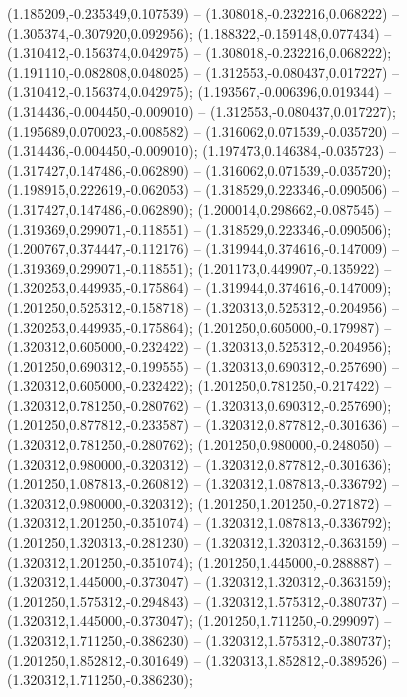  (1.185209,-0.235349,0.107539) -- (1.308018,-0.232216,0.068222) -- (1.305374,-0.307920,0.092956);
 (1.188322,-0.159148,0.077434) -- (1.310412,-0.156374,0.042975) -- (1.308018,-0.232216,0.068222);
 (1.191110,-0.082808,0.048025) -- (1.312553,-0.080437,0.017227) -- (1.310412,-0.156374,0.042975);
 (1.193567,-0.006396,0.019344) -- (1.314436,-0.004450,-0.009010) -- (1.312553,-0.080437,0.017227);
 (1.195689,0.070023,-0.008582) -- (1.316062,0.071539,-0.035720) -- (1.314436,-0.004450,-0.009010);
 (1.197473,0.146384,-0.035723) -- (1.317427,0.147486,-0.062890) -- (1.316062,0.071539,-0.035720);
 (1.198915,0.222619,-0.062053) -- (1.318529,0.223346,-0.090506) -- (1.317427,0.147486,-0.062890);
 (1.200014,0.298662,-0.087545) -- (1.319369,0.299071,-0.118551) -- (1.318529,0.223346,-0.090506);
 (1.200767,0.374447,-0.112176) -- (1.319944,0.374616,-0.147009) -- (1.319369,0.299071,-0.118551);
 (1.201173,0.449907,-0.135922) -- (1.320253,0.449935,-0.175864) -- (1.319944,0.374616,-0.147009);
 (1.201250,0.525312,-0.158718) -- (1.320313,0.525312,-0.204956) -- (1.320253,0.449935,-0.175864);
 (1.201250,0.605000,-0.179987) -- (1.320312,0.605000,-0.232422) -- (1.320313,0.525312,-0.204956);
 (1.201250,0.690312,-0.199555) -- (1.320313,0.690312,-0.257690) -- (1.320312,0.605000,-0.232422);
 (1.201250,0.781250,-0.217422) -- (1.320312,0.781250,-0.280762) -- (1.320313,0.690312,-0.257690);
 (1.201250,0.877812,-0.233587) -- (1.320312,0.877812,-0.301636) -- (1.320312,0.781250,-0.280762);
 (1.201250,0.980000,-0.248050) -- (1.320312,0.980000,-0.320312) -- (1.320312,0.877812,-0.301636);
 (1.201250,1.087813,-0.260812) -- (1.320312,1.087813,-0.336792) -- (1.320312,0.980000,-0.320312);
 (1.201250,1.201250,-0.271872) -- (1.320312,1.201250,-0.351074) -- (1.320312,1.087813,-0.336792);
 (1.201250,1.320313,-0.281230) -- (1.320312,1.320312,-0.363159) -- (1.320312,1.201250,-0.351074);
 (1.201250,1.445000,-0.288887) -- (1.320312,1.445000,-0.373047) -- (1.320312,1.320312,-0.363159);
 (1.201250,1.575312,-0.294843) -- (1.320312,1.575312,-0.380737) -- (1.320312,1.445000,-0.373047);
 (1.201250,1.711250,-0.299097) -- (1.320312,1.711250,-0.386230) -- (1.320312,1.575312,-0.380737);
 (1.201250,1.852812,-0.301649) -- (1.320313,1.852812,-0.389526) -- (1.320312,1.711250,-0.386230);
